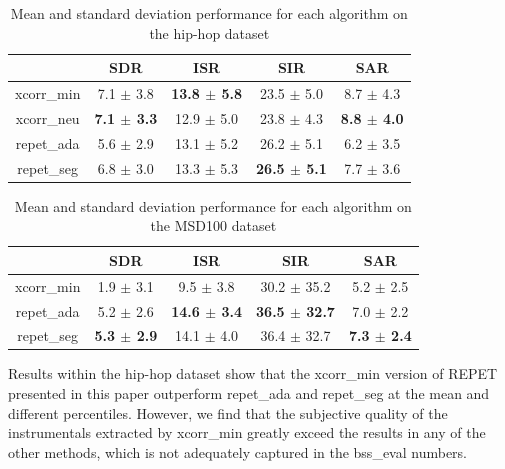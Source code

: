 \documentclass{article}
\begin{document}


  \begin{table}[h]
  \caption{Mean and standard deviation performance for each algorithm on the hip-hop dataset}
  \label{tab:meanHipHop}
  \begin{tabular}{@{} ccccc @{}}
    \hline
  & SDR & ISR & SIR & SAR \\
    \hline
xcorr\_min & 7.1 $\pm$ 3.8 & \textbf{13.8 $\pm$ 5.8} & 23.5 $\pm$ 5.0 & 8.7 $\pm$ 4.3 \\ 
xcorr\_neu & \textbf{7.1 $\pm$ 3.3} & 12.9 $\pm$ 5.0 & 23.8 $\pm$ 4.3 & \textbf{8.8 $\pm$ 4.0} \\ 
repet\_ada & 5.6 $\pm$ 2.9 & 13.1 $\pm$ 5.2 & 26.2 $\pm$ 5.1 & 6.2 $\pm$ 3.5 \\ 
repet\_seg & 6.8 $\pm$ 3.0 & 13.3 $\pm$ 5.3 & \textbf{26.5 $\pm$ 5.1} & 7.7 $\pm$ 3.6 \\ 
    \hline
  \end{tabular}
    \end{table}

  \begin{table}[h]
  \caption{Mean and standard deviation performance for each algorithm on the MSD100 dataset}
  \label{tab:meanMSD}
  \begin{tabular}{@{} ccccc @{}}
    \hline
 & SDR & ISR & SIR & SAR \\
    \hline
xcorr\_min & 1.9 $\pm$ 3.1 & 9.5 $\pm$ 3.8 & 30.2 $\pm$ 35.2 & 5.2 $\pm$ 2.5 \\ 
repet\_ada & 5.2 $\pm$ 2.6 & \textbf{14.6 $\pm$ 3.4} & \textbf{36.5 $\pm$ 32.7} & 7.0 $\pm$ 2.2 \\ 
repet\_seg & \textbf{5.3 $\pm$ 2.9} & 14.1 $\pm$ 4.0 & 36.4 $\pm$ 32.7 & \textbf{7.3 $\pm$ 2.4} \\ 
    \hline
  \end{tabular}
    \end{table}

Results within the hip-hop dataset show that the xcorr\_min version of REPET presented in this paper outperform repet\_ada and repet\_seg at the mean and different percentiles. However, we find that the subjective quality of the instrumentals extracted by xcorr\_min greatly exceed the results in any of the other methods, which is not adequately captured in the bss\_eval numbers. 
\end{document}
